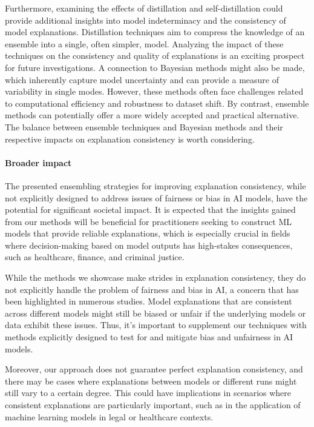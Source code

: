 Furthermore, examining the effects of distillation and self-distillation could provide additional insights into model indeterminacy and the consistency of model explanations. Distillation techniques aim to compress the knowledge of an ensemble into a single, often simpler, model. Analyzing the impact of these techniques on the consistency and quality of explanations is an exciting prospect for future investigations. A connection to Bayesian methods might also be made, which inherently capture model uncertainty and can provide a measure of variability in single modes. However, these methods often face challenges related to computational efficiency and robustness to dataset shift. By contrast, ensemble methods can potentially offer a more widely accepted and practical alternative. The balance between ensemble techniques and Bayesian methods and their respective impacts on explanation consistency is worth considering.

\paragraph{Broader impact} The presented ensembling strategies for improving explanation consistency, while not explicitly designed to address issues of fairness or bias in AI models, have the potential for significant societal impact. It is expected that the insights gained from our methods will be beneficial for practitioners seeking to construct ML models that provide reliable explanations, which is especially crucial in fields where decision-making based on model outputs has high-stakes consequences, such as healthcare, finance, and criminal justice.

While the methods we showcase make strides in explanation consistency, they do not explicitly handle the problem of fairness and bias in AI, a concern that has been highlighted in numerous studies. Model explanations that are consistent across different models might still be biased or unfair if the underlying models or data exhibit these issues. Thus, it's important to supplement our techniques with methods explicitly designed to test for and mitigate bias and unfairness in AI models.

Moreover, our approach does not guarantee perfect explanation consistency, and there may be cases where explanations between models or different runs might still vary to a certain degree. This could have implications in scenarios where consistent explanations are particularly important, such as in the application of machine learning models in legal or healthcare contexts.

